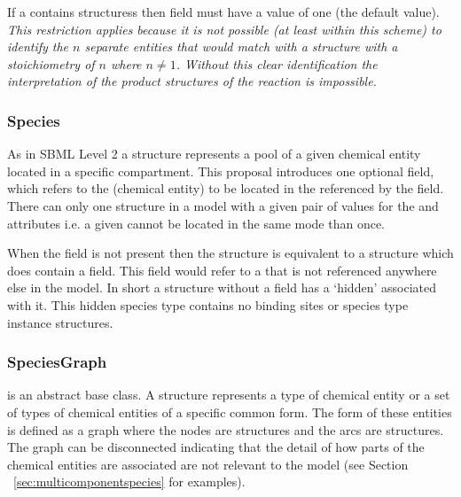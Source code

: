 \documentclass{cekarticle}
\begin{document}
If a  contains
 structuress then
 field must have a value of one (the default
value). \emph{This restriction applies because it is not possible
(at least within this scheme) to identify the $n$ separate
entities that would match with a 
structure with a stoichiometry of $n$ where $n \neq 1$.  Without
this clear identification the interpretation of the product
structures of the reaction is impossible.}

\subsubsection{Species}
\label{sec:species}

As in SBML Level 2 a  structure represents a pool
of a given chemical entity located in a specific compartment. This
proposal introduces one optional  field,
 which refers to the 
(chemical entity) to be located in the 
referenced by the  field.  There can only one
 structure in a model with a given pair of values
for the  and  attributes
i.e. a given  cannot be located in the same
 mode than once.

When the  field is not present then the
 structure is equivalent to a 
structure which does contain a  field. This
field would refer to a  that is not referenced
anywhere else in the model. In short a  structure
without a  field has a `hidden'
 associated with it.  This hidden species type
contains no binding sites or species type instance structures.

\subsubsection{SpeciesGraph}

 is an abstract base class. A
 structure represents a type of chemical
entity or a set of types of chemical entities of a specific common
form. The form of these entities is defined as a graph where the
nodes are  structures and the arcs are
 structures.  The graph can be disconnected indicating
that the detail of how parts of the chemical entities are
associated are not relevant to the model (see Section
~\ref{sec:multicomponentspecies} for examples).
\end{document}
